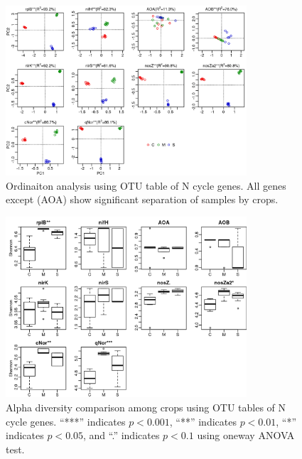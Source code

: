 \documentclass[12pt]{article}
\begin{document}
    \begin{figure}[tbph!]
    \centering
    \includegraphics[width=0.8\textwidth]{figures/xander-ncycle-otu-pca}
    \caption[Ordination analysis using OTU table of N cycle genes]{Ordinaiton analysis using OTU table of N cycle genes. All genes except (AOA) show significant separation of samples by crops.}
    \label{fig:xander-ncycle-otu-pca}
    \end{figure}


    \begin{figure}[tbph!]
    \centering
    \includegraphics[width=0.8\textwidth]{figures/xander-ncycle-otu-shannon}
    \caption[Alpha diversity using OTU table of N cycle genes]{Alpha diversity comparison among crops using OTU tables of N cycle genes. ``***'' indicates $p <  0.001$, ``**'' indicates $p < 0.01$, ``*'' indicates $p < 0.05$, and ``.'' indicates $p < 0.1$ using oneway ANOVA test.}
    \label{fig:xander-ncycle-otu-shannon}
    \end{figure}
\end{document}
